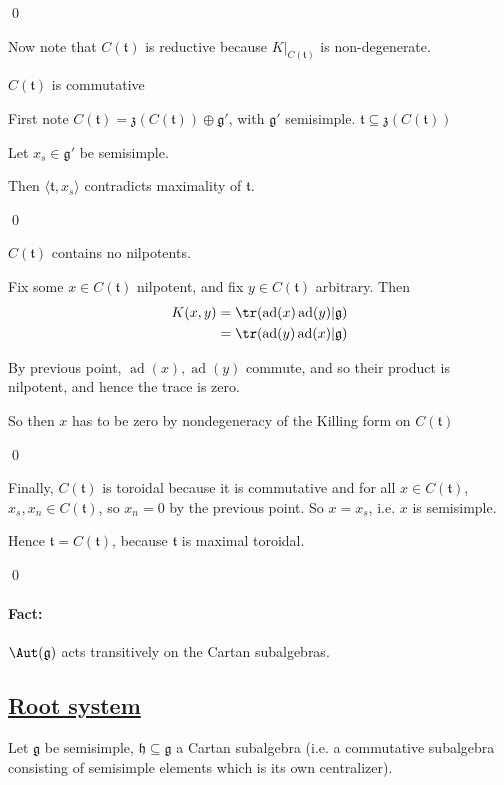 \documentclass[x11names,reqno,14pt]{extarticle}
\newcommand{\mk}[1]{\mathfrak{#1}}
\newcommand{\g}{\mk{g}}
\newcommand{\h}{\mk{h}}
\renewcommand{\t}{\mk{t}}
\DeclareMathOperator{\ad}{ad}
\begin{document}
\qed

Now note that $C(\mk{t})$ is reductive because $K|_{C(\mk{t})}$ is non-degenerate. 

\claim

$C(\mk{t})$ is commutative

\proof

First note $C(\mk{t}) = \mk{z}(C(\mk{t}))\oplus\g'$, with $\g'$ semisimple. $\mk{t}\subseteq\mk{z}(C(\mk{t}))$

Let $x_s \in \g'$ be semisimple. 

Then $\langle \mk{t}, x_s \rangle$ contradicts maximality of $\mk{t}$. 

\qed

\claim

$C(\mk{t})$ contains no nilpotents. 

\proof

Fix some $x \in C(\mk{t})$ nilpotent, and fix $y \in C(\mk{t})$ arbitrary. Then
\begin{align*}
K(x,y) & = \tr(\ad(x)\ad(y)|\g) \\
& = \tr(\ad(y)\ad(x)|\g)
\end{align*}

By previous point, $\ad(x),\ad(y)$ commute, and so their product is nilpotent, and hence the trace is zero. 

So then $x$ has to be zero by nondegeneracy of the Killing form on $C(\mk{t})$

\qed

Finally, $C(\mk{t})$ is toroidal because it is commutative and for all $x \in C(\mk{t})$, $x_s,x_n \in C(\mk{t})$, so $x_n = 0$ by the previous point. So $x = x_s$, i.e. $x$ is semisimple. 

Hence $\t = C(\mk{t})$, because $\mk{t}$ is maximal toroidal. 

\qed

\paragraph{Fact:} $\Aut(\g)$ acts transitively on the Cartan subalgebras. 

\subsection*{\underline{Root system}}

Let $\g$ be semisimple, $\h\subseteq\g$ a Cartan subalgebra (i.e. a commutative subalgebra consisting of semisimple elements which is its own centralizer). 
\end{document}
